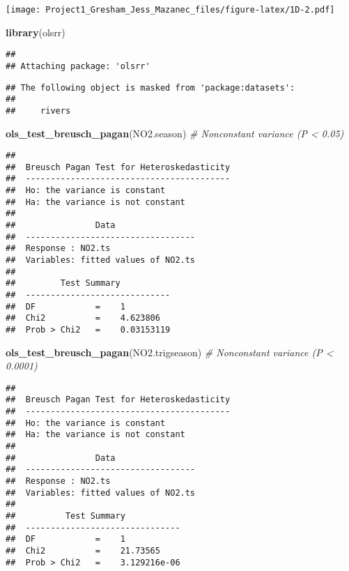 \documentclass[
]{article}
\newenvironment{Shaded}{\begin{snugshade}}{\end{snugshade}}
\newcommand{\CommentTok}[1]{\textcolor[rgb]{0.56,0.35,0.01}{\textit{#1}}}
\newcommand{\KeywordTok}[1]{\textcolor[rgb]{0.13,0.29,0.53}{\textbf{#1}}}
\newcommand{\NormalTok}[1]{#1}
\begin{document}
\texttt{[image: Project1\_Gresham\_Jess\_Mazanec\_files/figure-latex/1D-2.pdf]}

\begin{Shaded}
\begin{Highlighting}[]
\KeywordTok{library}\NormalTok{(olsrr)}
\end{Highlighting}
\end{Shaded}

\begin{verbatim}
## 
## Attaching package: 'olsrr'
\end{verbatim}

\begin{verbatim}
## The following object is masked from 'package:datasets':
## 
##     rivers
\end{verbatim}

\begin{Shaded}
\begin{Highlighting}[]
\KeywordTok{ols_test_breusch_pagan}\NormalTok{(NO2.season) }\CommentTok{# Nonconstant variance (P < 0.05)}
\end{Highlighting}
\end{Shaded}

\begin{verbatim}
## 
##  Breusch Pagan Test for Heteroskedasticity
##  -----------------------------------------
##  Ho: the variance is constant            
##  Ha: the variance is not constant        
## 
##                Data                
##  ----------------------------------
##  Response : NO2.ts 
##  Variables: fitted values of NO2.ts 
## 
##         Test Summary          
##  -----------------------------
##  DF            =    1 
##  Chi2          =    4.623806 
##  Prob > Chi2   =    0.03153119
\end{verbatim}

\begin{Shaded}
\begin{Highlighting}[]
\KeywordTok{ols_test_breusch_pagan}\NormalTok{(NO2.trigseason) }\CommentTok{# Nonconstant variance (P < 0.0001)}
\end{Highlighting}
\end{Shaded}

\begin{verbatim}
## 
##  Breusch Pagan Test for Heteroskedasticity
##  -----------------------------------------
##  Ho: the variance is constant            
##  Ha: the variance is not constant        
## 
##                Data                
##  ----------------------------------
##  Response : NO2.ts 
##  Variables: fitted values of NO2.ts 
## 
##          Test Summary           
##  -------------------------------
##  DF            =    1 
##  Chi2          =    21.73565 
##  Prob > Chi2   =    3.129216e-06
\end{verbatim}
\end{document}
